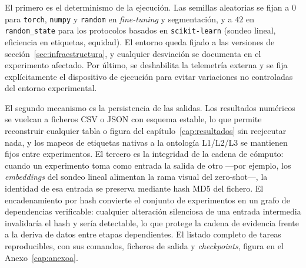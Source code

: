 El primero es el determinismo de la ejecución. Las semillas
aleatorias se fijan a $0$ para \texttt{torch}, \texttt{numpy} y
\texttt{random} en \emph{fine-tuning} y segmentación, y a $42$ en
\texttt{random\_state} para los protocolos basados en
\texttt{scikit-learn} (sondeo lineal, eficiencia en etiquetas,
equidad). El entorno queda fijado a las versiones de
sección~\ref{sec:infraestructura}, y cualquier desviación se
documenta en el experimento afectado. Por último, se deshabilita la
telemetría externa y se fija explícitamente el dispositivo de
ejecución para evitar variaciones no controladas del entorno
experimental.

El segundo mecanismo es la persistencia de las salidas. Los
resultados numéricos se vuelcan a ficheros CSV o JSON con esquema
estable, lo que permite reconstruir cualquier tabla o figura del
capítulo~\ref{cap:resultados} sin reejecutar nada, y los mapeos de
etiquetas nativas a la ontología L1/L2/L3 se mantienen fijos entre
experimentos. El tercero es la integridad de la cadena de cómputo:
cuando un experimento toma como entrada la salida de otro ---por
ejemplo, los \emph{embeddings} del sondeo lineal alimentan la rama
visual del zero-shot---, la identidad de esa entrada se preserva
mediante hash MD5 del fichero. El encadenamiento por hash convierte
el conjunto de experimentos en un grafo de dependencias verificable:
cualquier alteración silenciosa de una entrada intermedia
invalidaría el hash y sería detectable, lo que protege la cadena de
evidencia frente a la deriva de datos entre etapas dependientes. El
listado completo de tareas reproducibles, con sus comandos, ficheros
de salida y \emph{checkpoints}, figura en el
Anexo~\ref{cap:anexoa}.
